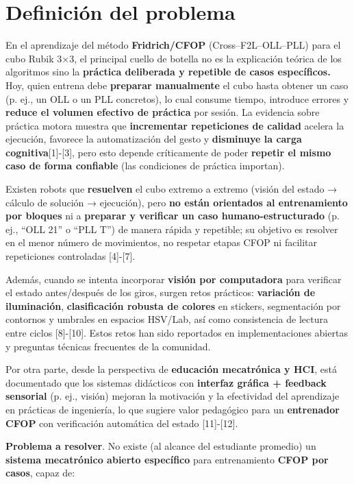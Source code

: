 \section{Definición del problema}

En el aprendizaje del método \textbf{Fridrich/CFOP} (Cross–F2L–OLL–PLL) para el cubo Rubik 3×3, el principal cuello de botella no es la explicación teórica de los algoritmos sino la \textbf{práctica deliberada y repetible de casos específicos.} Hoy, quien entrena debe \textbf{preparar manualmente} el cubo hasta obtener un caso (p. ej., un OLL o un PLL concretos), lo cual consume tiempo, introduce errores y \textbf{reduce el volumen efectivo de práctica} por sesión. La evidencia sobre práctica motora muestra que \textbf{incrementar repeticiones de calidad} acelera la ejecución, favorece la automatización del gesto y \textbf{disminuye la carga cognitiva}[1]-[3], pero esto depende críticamente de poder \textbf{repetir el mismo caso de forma confiable} (las condiciones de práctica importan).

Existen robots que \textbf{resuelven} el cubo extremo a extremo (visión del estado → cálculo de solución → ejecución), pero \textbf{no están orientados al entrenamiento por bloques} ni a \textbf{preparar y verificar un caso humano-estructurado} (p. ej., “OLL 21” o “PLL T”) de manera rápida y repetible; su objetivo es resolver en el menor número de movimientos, no respetar etapas CFOP ni facilitar repeticiones controladas [4]-[7].

Además, cuando se intenta incorporar \textbf{visión por computadora} para verificar el estado antes/después de los giros, surgen retos prácticos: \textbf{variación de iluminación}, \textbf{clasificación robusta de colores} en stickers, segmentación por contornos y umbrales en espacios HSV/Lab, así como consistencia de lectura entre ciclos [8]-[10]. Estos retos han sido reportados en implementaciones abiertas y preguntas técnicas frecuentes de la comunidad.

Por otra parte, desde la perspectiva de \textbf{educación mecatrónica y HCI}, está documentado que los sistemas didácticos con \textbf{interfaz gráfica + feedback sensorial} (p. ej., visión) mejoran la motivación y la efectividad del aprendizaje en prácticas de ingeniería, lo que sugiere valor pedagógico para un \textbf{entrenador CFOP} con verificación automática del estado [11]-[12].

\textbf{Problema a resolver}. No existe (al alcance del estudiante promedio) un \textbf{sistema mecatrónico abierto específico} para entrenamiento \textbf{CFOP por casos}, capaz de:

